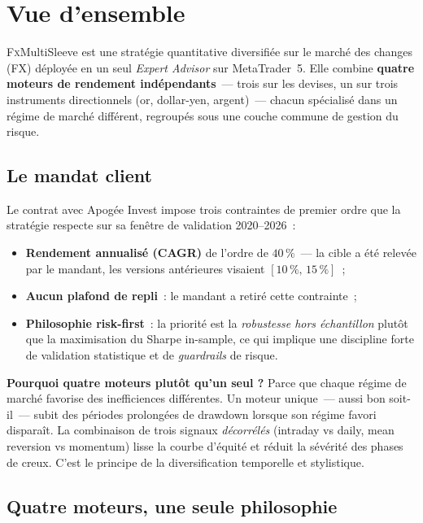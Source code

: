 \documentclass[11pt, a4paper]{scrartcl}
\begin{document}
\section{Vue d'ensemble}
\label{sec:overview}

\lettrine[lines=2, findent=2pt, nindent=0pt]{F}{x}MultiSleeve est une stratégie quantitative diversifiée sur le marché des changes (FX) déployée en un seul \emph{Expert Advisor} sur MetaTrader~5. Elle combine \textbf{quatre moteurs de rendement indépendants}~--- trois sur les devises, un sur trois instruments directionnels (or, dollar-yen, argent)~--- chacun spécialisé dans un régime de marché différent, regroupés sous une couche commune de gestion du risque.

\subsection{Le mandat client}

Le contrat avec Apogée Invest impose trois contraintes de premier ordre que la stratégie respecte sur sa fenêtre de validation 2020--2026~:

\begin{itemize}
\item \textbf{Rendement annualisé (CAGR)} de l'ordre de $40\,\%$~--- la cible a été relevée par le mandant, les versions antérieures visaient $[10\,\%,\,15\,\%]$~;
\item \textbf{Aucun plafond de repli}~: le mandant a retiré cette contrainte~;
\item \textbf{Philosophie risk-first}~: la priorité est la \emph{robustesse hors échantillon} plutôt que la maximisation du Sharpe in-sample, ce qui implique une discipline forte de validation statistique et de \emph{guardrails} de risque.
\end{itemize}

\begin{insightbox}
\textbf{Pourquoi quatre moteurs plutôt qu'un seul ?} Parce que chaque régime de
marché favorise des inefficiences différentes. Un moteur unique~--- aussi bon
soit-il~--- subit des périodes prolongées de drawdown lorsque son régime favori
disparaît. La combinaison de trois signaux \emph{décorrélés} (intraday vs daily,
mean reversion vs momentum) lisse la courbe d'équité et réduit la sévérité des
phases de creux. C'est le principe de la diversification temporelle et stylistique.
\end{insightbox}

\subsection{Quatre moteurs, une seule philosophie}
\end{document}
